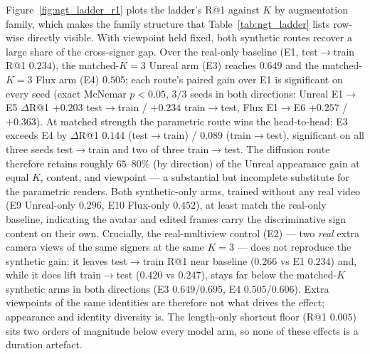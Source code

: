 Figure~\ref{fig:ngt_ladder_r1} plots the ladder's R@1 against $K$ by
augmentation family, which makes the family structure that
Table~\ref{tab:ngt_ladder} lists row-wise directly visible.
With viewpoint held fixed, both synthetic routes recover a large share of the 
cross-signer gap. Over the real-only baseline (E1, test$\to$train R@1 $0.234$), the
matched-$K{=}3$ Unreal arm (E3) reaches $0.649$ and the matched-$K{=}3$ Flux arm
(E4) $0.505$; each route's paired gain over E1 is significant on every
seed (exact McNemar $p<0.05$, $3/3$ seeds in both directions: Unreal
E1$\to$E5 $\Delta$R@1 $+0.203$ test$\to$train / $+0.234$ train$\to$test, Flux E1$\to$E6
$+0.257$ / $+0.363$).
At matched strength the parametric route wins the head-to-head:
E3 exceeds E4 by $\Delta$R@1 $0.144$ (test$\to$train) / $0.089$ (train$\to$test), significant on
all three seeds test$\to$train and two of three train$\to$test. The diffusion route therefore
retains roughly $65$--$80\%$ (by
direction) of the Unreal appearance gain at equal $K$, content, and viewpoint
--- a substantial but incomplete substitute for the parametric renders. Both
synthetic-only arms, trained without any real video (E9 Unreal-only $0.296$, E10
Flux-only $0.452$), at least match the real-only baseline, indicating the avatar
and edited frames carry the discriminative sign content on their own.
Crucially,
the real-multiview control (E2) --- two \emph{real} extra camera views of the
same signers at the same $K{=}3$ --- does not reproduce the synthetic gain: it
leaves test$\to$train R@1 near baseline ($0.266$ vs E1 $0.234$) and, while it does lift
train$\to$test ($0.420$ vs $0.247$), stays far below the matched-$K$ synthetic arms in
both directions (E3 $0.649$/$0.695$, E4 $0.505$/$0.606$). Extra viewpoints of the
same identities are therefore not what drives the effect; appearance and
identity diversity is. The length-only shortcut floor (R@1 $0.005$) sits two
orders of magnitude below every model arm, so none of these effects is a
duration artefact.


